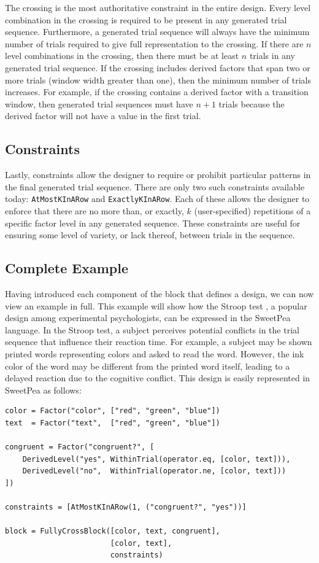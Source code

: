 The crossing is the most authoritative constraint in the entire design. Every level combination in the crossing is required to be present in any generated trial sequence. Furthermore, a generated trial sequence will always have the minimum number of trials required to give full representation to the crossing. If there are $n$ level combinations in the crossing, then there must be at least $n$ trials in any generated trial sequence. If the crossing includes derived factors that span two or more trials (window width greater than one), then the minimum number of trials increases. For example, if the crossing contains a derived factor with a transition window, then generated trial sequences must have $n+1$ trials because the derived factor will not have a value in the first trial.

\subsection{Constraints}

Lastly, constraints allow the designer to require or prohibit particular patterns in the final generated trial sequence. There are only two such constraints available today: \texttt{AtMostKInARow} and \texttt{ExactlyKInARow}. Each of these allows the designer to enforce that there are no more than, or exactly, $k$ (user-specified) repetitions of a specific factor level in any generated sequence. These constraints are useful for ensuring some level of variety, or lack thereof, between trials in the sequence.

\subsection{Complete Example}

Having introduced each component of the block that defines a design, we can now view an example in full. This example will show how the Stroop test \cite{stroop1935studies}, a popular design among experimental psychologists, can be expressed in the SweetPea language. In the Stroop test, a subject perceives potential conflicts in the trial sequence that influence their reaction time. For example, a subject may be shown printed words representing colors and asked to read the word. However, the ink color of the word may be different from the printed word itself, leading to a delayed reaction due to the cognitive conflict. This design is easily represented in SweetPea as follows:

\begin{verbatim}
color = Factor("color", ["red", "green", "blue"])
text  = Factor("text",  ["red", "green", "blue"])

congruent = Factor("congruent?", [
    DerivedLevel("yes", WithinTrial(operator.eq, [color, text])),
    DerivedLevel("no",  WithinTrial(operator.ne, [color, text]))
])

constraints = [AtMostKInARow(1, ("congruent?", "yes"))]

block = FullyCrossBlock([color, text, congruent],
                        [color, text],
                        constraints)
\end{verbatim}

